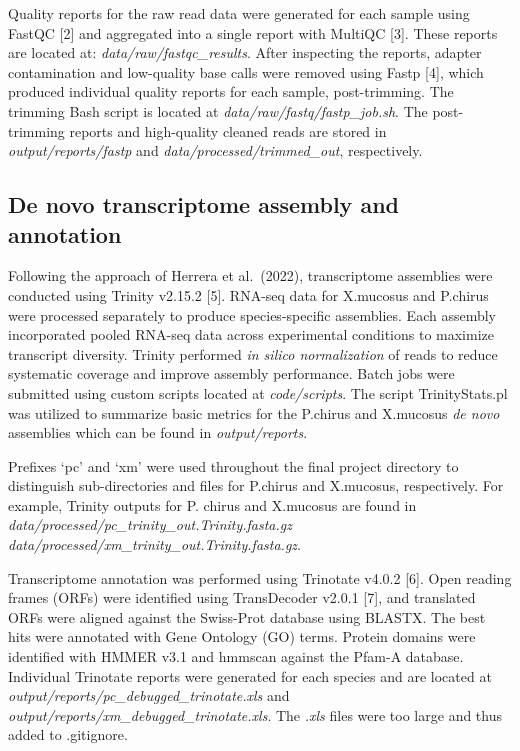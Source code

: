\documentclass[12pt,]{article}
\begin{document}
Quality reports for the raw read data were generated for each sample
using FastQC {[}2{]} and aggregated into a single report with MultiQC
{[}3{]}. These reports are located at: \emph{data/raw/fastqc\_results}.
After inspecting the reports, adapter contamination and low-quality base
calls were removed using Fastp {[}4{]}, which produced individual
quality reports for each sample, post-trimming. The trimming Bash script
is located at \emph{data/raw/fastq/fastp\_job.sh}. The post-trimming
reports and high-quality cleaned reads are stored in
\emph{output/reports/fastp} and \emph{data/processed/trimmed\_out},
respectively.

\subsection{De novo transcriptome assembly and
annotation}\label{de-novo-transcriptome-assembly-and-annotation}

Following the approach of Herrera et al.~(2022), transcriptome
assemblies were conducted using Trinity v2.15.2 {[}5{]}. RNA-seq data
for X.mucosus and P.chirus were processed separately to produce
species-specific assemblies. Each assembly incorporated pooled RNA-seq
data across experimental conditions to maximize transcript diversity.
Trinity performed \emph{in silico normalization} of reads to reduce
systematic coverage and improve assembly performance. Batch jobs were
submitted using custom scripts located at \emph{code/scripts}. The
script TrinityStats.pl was utilized to summarize basic metrics for the
P.chirus and X.mucosus \emph{de novo} assemblies which can be found in
\emph{output/reports}.

Prefixes `pc' and `xm' were used throughout the final project directory
to distinguish sub-directories and files for P.chirus and X.mucosus,
respectively. For example, Trinity outputs for P. chirus and X.mucosus
are found in \emph{data/processed/pc\_trinity\_out.Trinity.fasta.gz}
\emph{data/processed/xm\_trinity\_out.Trinity.fasta.gz}.

Transcriptome annotation was performed using Trinotate v4.0.2 {[}6{]}.
Open reading frames (ORFs) were identified using TransDecoder v2.0.1
{[}7{]}, and translated ORFs were aligned against the Swiss-Prot
database using BLASTX. The best hits were annotated with Gene Ontology
(GO) terms. Protein domains were identified with HMMER v3.1 and hmmscan
against the Pfam-A database. Individual Trinotate reports were generated
for each species and are located at
\emph{output/reports/pc\_debugged\_trinotate.xls} and
\emph{output/reports/xm\_debugged\_trinotate.xls}. The \emph{.xls} files
were too large and thus added to .gitignore.
\end{document}
